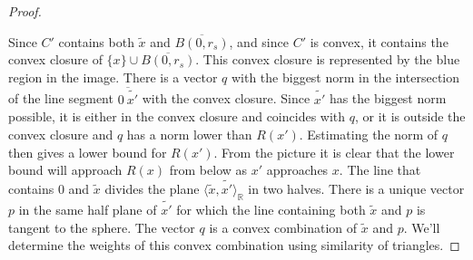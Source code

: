 \documentclass[10pt,a4paper]{amsart}
\newcommand{\realNumbers}{\mathbb{R}}
\begin{document}
\begin{proof}
\begin{center}
	\end{center}
	Since $C'$ contains both $\widetilde{x}$ and $\overline{B(0, r_s)}$, and since $C'$ is convex, it contains the convex closure of $\{x\} \cup \overline{B(0, r_s)}$. This convex closure is represented by the blue region in the image. There is a vector $q$ with the biggest norm in the intersection of the line segment $\overline{0 \ \widetilde{x'}}$ with the convex closure. Since $\widetilde{x'}$ has the biggest norm possible, it is either in the convex closure and coincides with $q$, or it is outside the convex closure and $q$ has a norm lower than $R(x')$. Estimating the norm of $q$ then gives a lower bound for $R(x')$. From the picture it is clear that the lower bound will approach $R(x)$ from below as $x'$ approaches $x$. The line that contains $0$ and $\widetilde{x}$ divides the plane $\langle \widetilde{x}, \widetilde{x'} \rangle_\realNumbers$ in two halves. There is a unique vector $p$ in the same half plane of $\widetilde{x'}$ for which the line containing both $\widetilde{x}$ and $p$ is tangent to the sphere. The vector $q$ is a convex combination of $\widetilde{x}$ and $p$. We'll determine the weights of this convex combination using similarity of triangles.
	

\end{proof}
\end{document}
